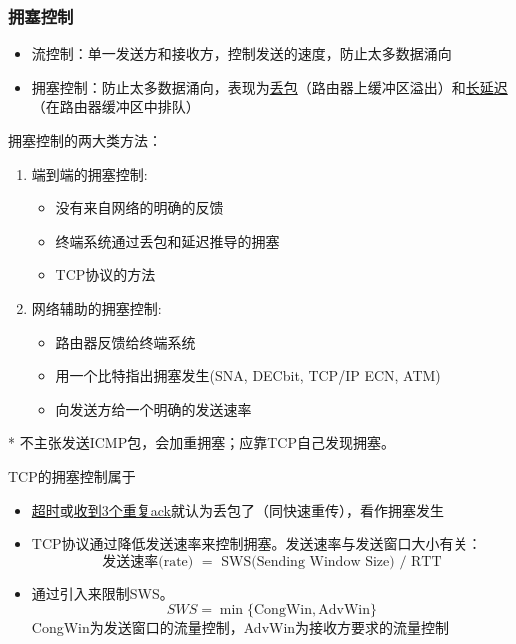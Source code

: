 \subsubsection{拥塞控制}
\begin{itemize}
\item 流控制：单一发送方和接收方，控制发送的速度，防止太多数据涌向
\item 拥塞控制：防止太多数据涌向，表现为\underline{丢包}（路由器上缓冲区溢出）和\underline{长延迟}（在路由器缓冲区中排队）
\end{itemize}

\myhline
拥塞控制的两大类方法：
\begin{enumerate}
    \item 端到端的拥塞控制:
\begin{itemize}
    \item 没有来自网络的明确的反馈
    \item 终端系统通过丢包和延迟推导的拥塞
    \item TCP协议的方法
\end{itemize}
    \item 网络辅助的拥塞控制:
\begin{itemize}
    \item 路由器反馈给终端系统
    \item 用一个比特指出拥塞发生(SNA, DECbit, TCP/IP ECN, ATM)
    \item 向发送方给一个明确的发送速率
\end{itemize}
\end{enumerate}
* 不主张发送ICMP包，会加重拥塞；应靠TCP自己发现拥塞。

TCP的拥塞控制属于
\begin{itemize}
    \item \underline{超时}或\underline{收到3个重复ack}就认为丢包了（同快速重传），看作拥塞发生
    \item TCP协议通过降低发送速率来控制拥塞。发送速率与发送窗口大小有关：
\[\text{发送速率(rate) $=$ SWS(Sending Window Size) $/$ RTT}\]
    \item 通过引入来限制SWS。
\[SWS = \min\{\text{CongWin}, \text{AdvWin}\}\]
    CongWin为发送窗口的流量控制，AdvWin为接收方要求的流量控制
\end{itemize}

